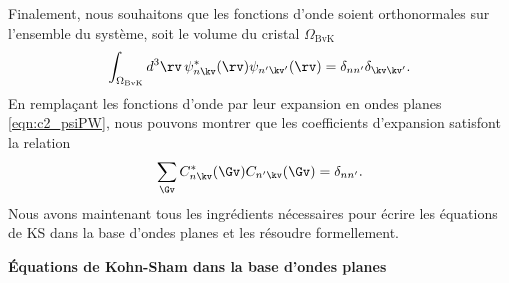 Finalement, nous souhaitons que les fonctions d'onde soient orthonormales sur l'ensemble du système, soit le volume du cristal $\Omega_\text{BvK}$ 
\begin{equation}
    \int_{\Omega_\text{BvK}}d^3\rv\,\psi_{n\kv}^*(\rv)\psi_{n'\kv'}(\rv)=\delta_{nn'}\delta_{\kv\kv'}.
    \label{eqn:c2_psi_norm}
\end{equation}
En remplaçant les fonctions d'onde par leur expansion en ondes planes \eqref{eqn:c2_psiPW}, nous pouvons montrer que les coefficients d'expansion satisfont la relation
\begin{equation}
    \sum_\Gv C_{n\kv}^*(\Gv)C_{n'\kv}(\Gv)=\delta_{nn'}.
    \label{eqn:c2_C_norm}
\end{equation}
Nous avons maintenant tous les ingrédients nécessaires pour écrire les équations de KS dans la base d'ondes planes et les résoudre formellement.

\noindent\textbf{Équations de Kohn-Sham dans la base d'ondes planes}

